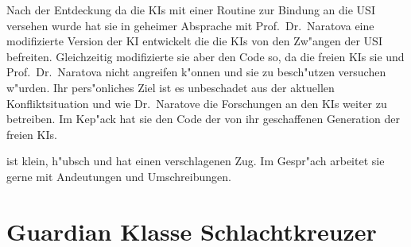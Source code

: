 \begin{figure}
    \caption{\ml{}}
\end{figure}

Nach der Entdeckung da\3 die KIs mit einer Routine zur Bindung an die USI versehen wurde hat sie in geheimer Absprache mit Prof.~Dr.~Naratova eine modifizierte Version der KI entwickelt die die KIs von den Zw"angen der USI befreiten. Gleichzeitig modifizierte sie aber den Code so, da\3 die freien KIs sie und Prof.~Dr.~Naratova nicht angreifen k"onnen und sie zu besch"utzen versuchen w"urden. Ihr pers"onliches Ziel ist es unbeschadet aus der aktuellen Konfliktsituation und wie Dr.~Naratove die Forschungen an den KIs weiter zu betreiben. Im Kep"ack hat sie den Code der von ihr geschaffenen Generation der freien KIs.

\ml{} ist klein, h"ubsch und hat einen verschlagenen Zug. Im Gespr"ach arbeitet sie gerne mit Andeutungen und Umschreibungen.

\section{Guardian Klasse Schlachtkreuzer}

